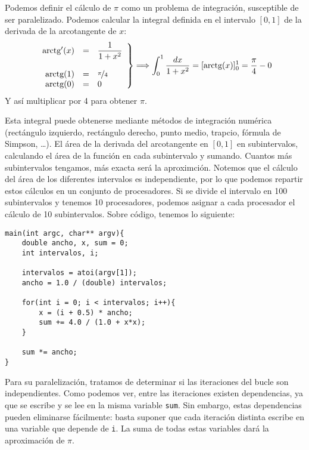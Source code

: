Podemos definir el cálculo de $\pi$ como un problema de integración, susceptible de ser paralelizado. Podemos calcular la integral definida en el intervalo $[0,1]$ de la derivada de la arcotangente de $x$:
\begin{equation*}
    \left.\begin{array}{rcl}
        \text{arctg}'(x) & = & \dfrac{1}{1+x^2} \\
                  & & \\
        \text{arctg}(1) & = & \nicefrac{\pi}{4} \\
        \text{arctg}(0) & = & 0 
    \end{array}\right\} \Longrightarrow \int_{0}^{1} \dfrac{dx}{1+x^2} = [\text{arctg}(x)]_0^1 = \dfrac{\pi}{4} - 0
\end{equation*}
Y así multiplicar por 4 para obtener $\pi$.

Esta integral puede obtenerse mediante métodos de integración numérica (rectángulo izquierdo, rectángulo derecho, punto medio, trapcio, fórmula de Simpson, \ldots). El área de la derivada del arcotangente en $[0,1]$ en subintervalos, calculando el área de la función en cada subintervalo y sumando. Cuantos más subintervalos tengamos, más exacta será la aproximción.
Notemos que el cálculo del área de los diferentes intervalos es independiente, por lo que podemos repartir estos cálculos en un conjunto de procesadores. Si se divide el intervalo en 100 subintervalos y tenemos 10 procesadores, podemos asignar a cada procesador el cálculo de 10 subintervalos. Sobre código, tenemos lo siguiente:
    \begin{verbatim}
main(int argc, char** argv){
    double ancho, x, sum = 0;
    int intervalos, i;

    intervalos = atoi(argv[1]);
    ancho = 1.0 / (double) intervalos;

    for(int i = 0; i < intervalos; i++){
        x = (i + 0.5) * ancho;
        sum += 4.0 / (1.0 + x*x);
    }

    sum *= ancho;
}
    \end{verbatim}
Para su paralelización, tratamos de determinar si las iteraciones del bucle son independientes. Como podemos ver, entre las iteraciones existen dependencias, ya que se escribe y se lee en la misma variable \verb|sum|. Sin embargo, estas dependencias pueden eliminarse fácilmente: basta suponer que cada iteración distinta escribe en una variable que depende de \verb|i|. La suma de todas estas variables dará la aproximación de $\pi$. 

